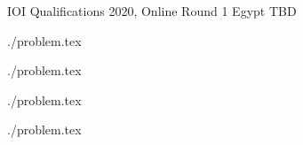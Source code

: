 \documentclass [11pt, a4paper, oneside] {article}
\begin{document}
\contest
{IOI Qualifications 2020, Online Round 1}%
{Egypt}%
{TBD}%


\renewcommand{\t}{\texttt}


\graphicspath{{../../problems/exams/statements/english/}}
  \def\ProblemIndex{A}
{./problem.tex}
\graphicspath{{../../problems/andorxor/statements/english/}}
  \def\ProblemIndex{B}
{./problem.tex}
\graphicspath{{../../problems/naruto-and-ichiraku-san/statements/english/}}
  \def\ProblemIndex{C}
{./problem.tex}
\graphicspath{{../../problems/keys-and-lamps-codeforces/statements/english/}}
  \def\ProblemIndex{D}
{./problem.tex}
\end{document}
